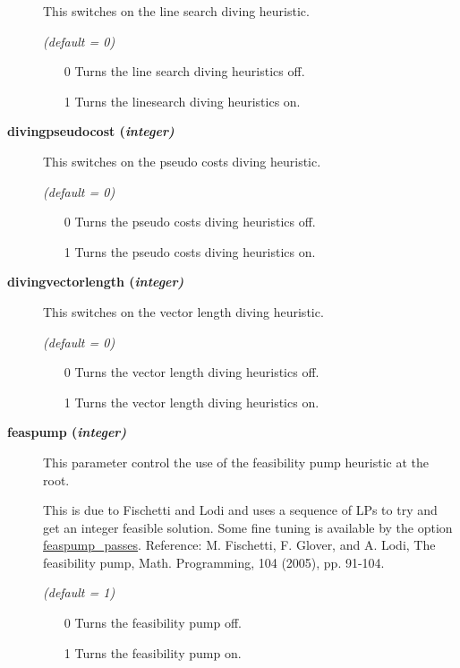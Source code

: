 \begin{description}
This switches on the line search diving heuristic.

\textsl{(default = 0)}
\begin{itemize}
\item[0]
Turns the line search diving heuristics off.
\item[1]
Turns the linesearch diving heuristics on.
\end{itemize}

\item[\label{divingpseudocost}\hypertarget{divingpseudocost}
{\textbf{divingpseudocost (\slshape{integer})}}]\hspace{1.0in}

This switches on the pseudo costs diving heuristic.

\textsl{(default = 0)}
\begin{itemize}
\item[0]
Turns the pseudo costs diving heuristics off.
\item[1]
Turns the pseudo costs diving heuristics on.
\end{itemize}

\item[\label{divingvectorlength}\hypertarget{divingvectorlength}
{\textbf{divingvectorlength (\slshape{integer})}}]\hspace{1.0in}

This switches on the vector length diving heuristic.

\textsl{(default = 0)}
\begin{itemize}
\item[0]
Turns the vector length diving heuristics off.
\item[1]
Turns the vector length diving heuristics on.
\end{itemize}

\item[\label{feaspump}\hypertarget{feaspump}
{\textbf{feaspump (\slshape{integer})}}]\hspace{1.0in}

This parameter control the use of the feasibility pump heuristic at the root.

This is due to Fischetti and Lodi and uses a sequence of LPs to try and get an integer feasible solution.
Some fine tuning is available by the option \hyperlink{feaspump_passes}{feaspump\_passes}.
Reference: M. Fischetti, F. Glover, and A. Lodi, The feasibility pump, Math. Programming, 104 (2005), pp. 91-104.

\textsl{(default = 1)}
\begin{itemize}
\item[0] 
Turns the feasibility pump off.
\item[1] 
Turns the feasibility pump on.
\end{itemize}


\end{description}

